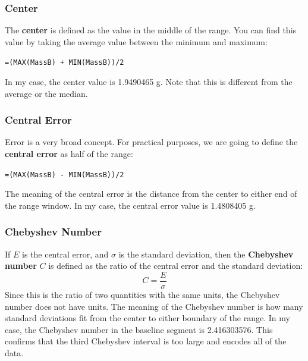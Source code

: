 \subsubsection{Center}
The \textbf{center} is defined as the value in the middle of the range. You can find this value by taking the average value between the minimum and maximum:
\begin{center}
    \texttt{=(MAX(MassB) + MIN(MassB))/2}
\end{center}
In my case, the center value is 1.9490465 g. Note that this is different from the average or the median.
\subsubsection{Central Error}
Error is a very broad concept. For practical purposes, we are going to define the \textbf{central error} as half of the range:
\begin{center}
    \texttt{=(MAX(MassB) - MIN(MassB))/2}
\end{center}
The meaning of the central error is the distance from the center to either end of the range window. In my case, the central error value is 1.4808405 g.
\subsubsection{Chebyshev Number}
If $E$ is the central error, and $\sigma$ is the standard deviation, then the \textbf{Chebyshev number} $C$ is defined as the ratio of the central error and the standard deviation:
\begin{equation}
    C = \frac{E}{\sigma}
\end{equation}
Since this is the ratio of two quantities with the same units, the Chebyshev number does not have units. The meaning of the Chebyshev number is how many standard deviations fit from the center to either boundary of the range. In my case, the Chebyshev number in the baseline segment is 2.416303576. This confirms that the third Chebyshev interval is too large and encodes all of the data.
